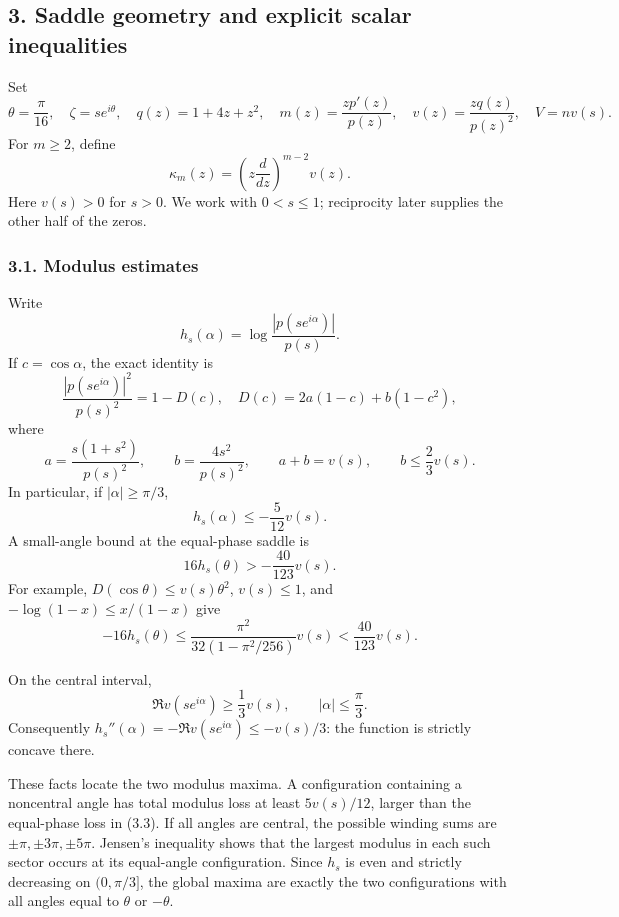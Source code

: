 \documentclass[
  11pt,
]{article}
\begin{document}
\subsection{3. Saddle geometry and explicit scalar
inequalities}\label{saddle-geometry-and-explicit-scalar-inequalities}

Set \[
 \theta=\frac\pi{16},\quad \zeta=s e^{i\theta},\quad
 q(z)=1+4z+z^2,\quad
 m(z)=\frac{zp'(z)}{p(z)},\quad
 v(z)=\frac{zq(z)}{p(z)^2},\quad V=n v(s).
\] For \(m\ge2\), define \[
 \kappa_m(z)=\left(z\frac d{dz}\right)^{m-2}v(z).
\] Here \(v(s)>0\) for \(s>0\). We work with \(0<s\le1\); reciprocity
later supplies the other half of the zeros.

\subsubsection{3.1. Modulus estimates}\label{modulus-estimates}

Write \[
 h_s(\alpha)=\log\frac{|p(s e^{i\alpha})|}{p(s)}.
\] If \(c=\cos\alpha\), the exact identity is \[
 \frac{|p(s e^{i\alpha})|^2}{p(s)^2}=1-D(c),
 \quad D(c)=2a(1-c)+b(1-c^2),
\] where \[
 a=\frac{s(1+s^2)}{p(s)^2},\qquad
 b=\frac{4s^2}{p(s)^2},\qquad a+b=v(s),\qquad b\le\frac23v(s).
                                                               \tag{3.1}
\] In particular, if \(|\alpha|\ge\pi/3\), \[
 h_s(\alpha)\le-\frac5{12}v(s).                       \tag{3.2}
\] A small-angle bound at the equal-phase saddle is \[
 16h_s(\theta)>-\frac{40}{123}v(s).                  \tag{3.3}
\] For example, \(D(\cos\theta)\le v(s)\theta^2\), \(v(s)\le1\), and
\(-\log(1-x)\le x/(1-x)\) give \[
 -16h_s(\theta)\le
 \frac{\pi^2}{32(1-\pi^2/256)}v(s)<\frac{40}{123}v(s).
\]

On the central interval, \[
 \Re v(s e^{i\alpha})\ge\frac13v(s),
 \qquad |\alpha|\le\frac\pi3.                       \tag{3.4}
\] Consequently \(h_s''(\alpha)=-\Re v(s e^{i\alpha})\le-v(s)/3\): the
function is strictly concave there.

These facts locate the two modulus maxima. A configuration containing a
noncentral angle has total modulus loss at least \(5v(s)/12\), larger
than the equal-phase loss in (3.3). If all angles are central, the
possible winding sums are \(\pm\pi,\pm3\pi,\pm5\pi\). Jensen's
inequality shows that the largest modulus in each such sector occurs at
its equal-angle configuration. Since \(h_s\) is even and strictly
decreasing on \((0,\pi/3]\), the global maxima are exactly the two
configurations with all angles equal to \(\theta\) or \(-\theta\).
\end{document}
